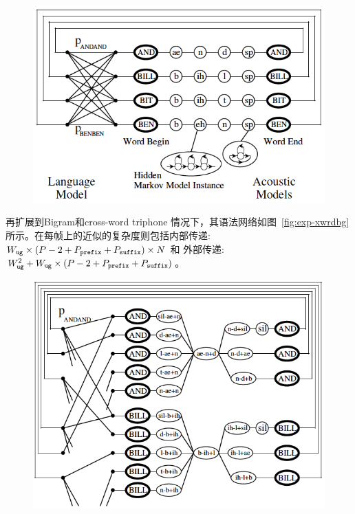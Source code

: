 \begin{figure}[!htp]
  \centering
    \captionstyle{\centering}
    \includegraphics[clip=true, width=\textwidth]{figure/bg.png}
\end{figure}


再扩展到Bigram和cross-word triphone 情况下，其语法网络如图~\ref{fig:exp-xwrdbg}所示。在每帧上的近似的复杂度则包括内部传递: $W_{\tt ug}\times (P-2+ P_{\tt prefix}+ P_{\tt suffix})\times N$ 和 外部传递: $W_{\tt ug}^2 + W_{\tt ug}\times (P-2+ P_{\tt prefix}+ P_{\tt suffix})$。

\begin{figure}[!htp]
  \centering
    \captionstyle{\centering}
    \includegraphics[clip=true, width=\textwidth]{figure/xwrdbg.png}
\end{figure}

